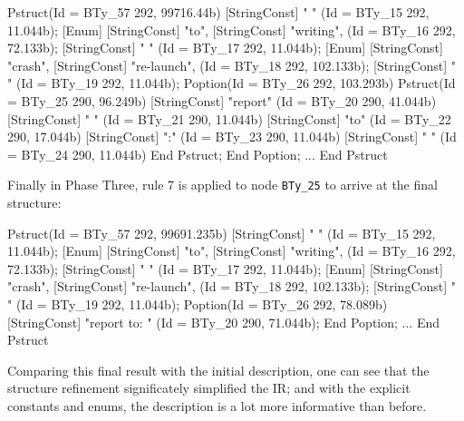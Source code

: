 \begin{code}
Pstruct(Id = BTy_57 292, 99716.44b)
  [StringConst] " " (Id = BTy_15 292, 11.044b);
  [Enum] {[StringConst] "to", [StringConst] "writing", } 
		(Id = BTy_16 292, 72.133b);
  [StringConst] " " (Id = BTy_17 292, 11.044b);
  [Enum] {[StringConst] "crash", [StringConst] "re-launch", } 
		(Id = BTy_18 292, 102.133b);
  [StringConst] " " (Id = BTy_19 292, 11.044b);
  Poption(Id = BTy_26 292, 103.293b)
    Pstruct(Id = BTy_25 290, 96.249b)
      [StringConst] "report" (Id = BTy_20 290, 41.044b)
      [StringConst] " " (Id = BTy_21 290, 11.044b)
      [StringConst] "to" (Id = BTy_22 290, 17.044b)
      [StringConst] ":" (Id = BTy_23 290, 11.044b)
      [StringConst] " " (Id = BTy_24 290, 11.044b)
    End Pstruct;
  End Poption;
...
End Pstruct
\end{code}

Finally in Phase Three, rule 7 is applied to node {\tt BTy\_25} to arrive at the 
final structure:
\begin{code}
Pstruct(Id = BTy_57 292, 99691.235b)
  [StringConst] " " (Id = BTy_15 292, 11.044b);
  [Enum] {[StringConst] "to", [StringConst] "writing", } 
		(Id = BTy_16 292, 72.133b);
  [StringConst] " " (Id = BTy_17 292, 11.044b);
  [Enum] {[StringConst] "crash", [StringConst] "re-launch", } 
		(Id = BTy_18 292, 102.133b);
  [StringConst] " " (Id = BTy_19 292, 11.044b);
  Poption(Id = BTy_26 292, 78.089b)
  	[StringConst] "report to: " (Id = BTy_20 290, 71.044b);
  End Poption;
  ...
End Pstruct
\end{code}

Comparing this final result with the initial description, one can see that
the structure refinement significately simplified the IR; and with
the explicit constants and enums, the description is a lot more
informative than before.
